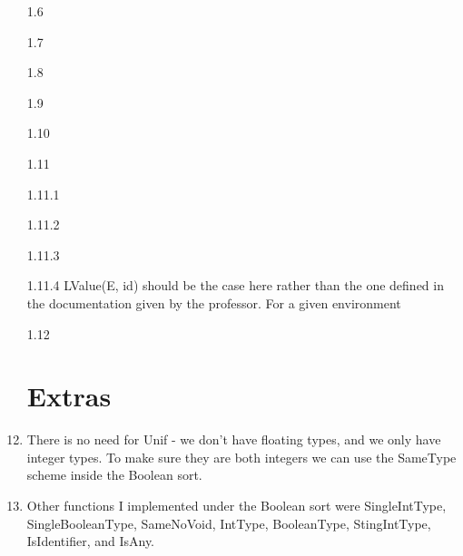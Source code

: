\documentclass[11pt, oneside]{article}
\begin{document}
\begin{enumerate}
\item[1.6]
\item[1.7] 
\item[1.8] 
\item[1.9] 
\item[1.10]
\item[1.11]
\item[1.11.1]
\item[1.11.2]
\item[1.11.3]
\item[1.11.4] LValue(E, id) should be the case here rather than the one defined in the documentation given by the professor. For a given environment 
\item[1.12] 

\section{Extras}
\item There is no need for Unif - we don't have floating types, and we only have integer types. To make sure they are both integers we can use the SameType scheme inside the Boolean sort.
\item Other functions I implemented under the Boolean sort were SingleIntType, SingleBooleanType, SameNoVoid, IntType, BooleanType, StingIntType, IsIdentifier, and IsAny.

\end{enumerate}
\end{document}
